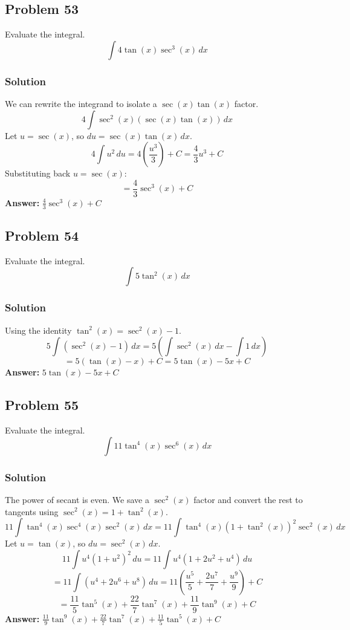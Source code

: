 \documentclass{article}
\begin{document}
\subsection{Problem 53}
Evaluate the integral.
$$ \int 4 \tan(x) \sec^3(x) \,dx $$
\subsubsection*{Solution}
We can rewrite the integrand to isolate a $\sec(x)\tan(x)$ factor.
$$ 4 \int \sec^2(x) (\sec(x)\tan(x)) \,dx $$
Let $u = \sec(x)$, so $du = \sec(x)\tan(x) \,dx$.
$$ 4 \int u^2 \,du = 4 \left( \frac{u^3}{3} \right) + C = \frac{4}{3}u^3 + C $$
Substituting back $u = \sec(x)$:
$$ = \frac{4}{3}\sec^3(x) + C $$
\textbf{Answer:} $ \frac{4}{3}\sec^3(x) + C $
\subsection{Problem 54}
Evaluate the integral.
$$ \int 5 \tan^2(x) \,dx $$
\subsubsection*{Solution}
Using the identity $\tan^2(x) = \sec^2(x) - 1$.
$$ 5 \int (\sec^2(x) - 1) \,dx = 5 (\int \sec^2(x) \,dx - \int 1 \,dx) $$
$$ = 5(\tan(x) - x) + C = 5\tan(x) - 5x + C $$
\textbf{Answer:} $ 5\tan(x) - 5x + C $
\subsection{Problem 55}
Evaluate the integral.
$$ \int 11 \tan^4(x) \sec^6(x) \,dx $$
\subsubsection*{Solution}
The power of secant is even. We save a $\sec^2(x)$ factor and convert the rest to tangents using $\sec^2(x) = 1 + \tan^2(x)$.
$$ 11 \int \tan^4(x) \sec^4(x) \sec^2(x) \,dx = 11 \int \tan^4(x) (1 + \tan^2(x))^2 \sec^2(x) \,dx $$
Let $u = \tan(x)$, so $du = \sec^2(x) \,dx$.
$$ 11 \int u^4 (1 + u^2)^2 \,du = 11 \int u^4 (1 + 2u^2 + u^4) \,du $$
$$ = 11 \int (u^4 + 2u^6 + u^8) \,du = 11 \left( \frac{u^5}{5} + \frac{2u^7}{7} + \frac{u^9}{9} \right) + C $$
$$ = \frac{11}{5}\tan^5(x) + \frac{22}{7}\tan^7(x) + \frac{11}{9}\tan^9(x) + C $$
\textbf{Answer:} $ \frac{11}{9}\tan^9(x) + \frac{22}{7}\tan^7(x) + \frac{11}{5}\tan^5(x) + C $
\end{document}
